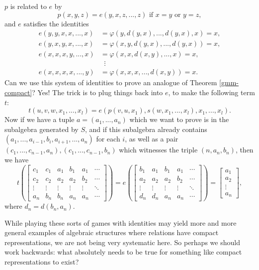 \documentclass[letterpaper,11pt]{article}
\begin{document}
$p$ is related to $e$ by
\[
p(x,y,z) = e(y,x,z,...,z)\text{ if }x = y\text{ or }y = z,
\]
and $e$ satisfies the identities
\begin{align*}
e(y,y,x,x,...,x) &= \varphi(y,d(y,x),...,d(y,x),x) = x,\\
e(y,x,y,x,...,x) &= \varphi(x, y, d(y,x), ..., d(y,x)) = x,\\
e(x,x,x,y,...,x) &= \varphi(x, x, d(x,y), ..., x) = x,\\
&\;\; \vdots\\
e(x,x,x,x,...,y) &= \varphi(x, x, x, ..., d(x,y)) = x.
\end{align*}
Can we use this system of identities to prove an analogue of Theorem \ref{gmm-compact}? Yes! The trick is to plug things back into $e$, to make the following term $t$:
\[
t(u,v,w,x_1,...,x_l) = e(p(v,u,x_1),s(w,x_1,...,x_l),x_1,...,x_l).
\]
Now if we have a tuple $a = (a_1,...,a_n)$ which we want to prove is in the subalgebra generated by $S$, and if this subalgebra already contains $(a_1,...,a_{i-1},b_i,a_{i+1}, ..., a_n)$ for each $i$, as well as a pair $(c_1, ..., c_{n-1}, a_n), (c_1, ..., c_{n-1}, b_n)$ which witnesses the triple $(n,a_n,b_n)$, then we have
\[
t\left(\begin{bmatrix} c_1 & c_1 & a_1 & b_1 & a_1 & \cdots\\ c_2 & c_2 & a_2 & a_2 & b_2 & \cdots\\ \vdots & \vdots & \vdots & \vdots & \vdots & \ddots\\ a_n & b_n & b_n & a_n & a_n & \cdots\end{bmatrix}\right) = e\left(\begin{bmatrix} b_1 & a_1 & b_1 & a_1 & \cdots\\ a_2 & a_2 & a_2 & b_2 & \cdots\\ \vdots &\vdots & \vdots & \vdots & \ddots\\ d_n & d_n & a_n & a_n & \cdots\end{bmatrix}\right) = \begin{bmatrix} a_1\\ a_2\\ \vdots\\ a_n\end{bmatrix},
\]
where $d_n = d(b_n,a_n)$.

While playing these sorts of games with identities may yield more and more general examples of algebraic structures where relations have compact representations, we are not being very systematic here. So perhaps we should work backwards: what absolutely needs to be true for something like compact representations to exist?
\end{document}
